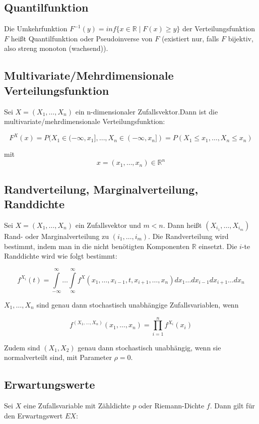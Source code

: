 \documentclass{scrartcl}%
\begin{document}
\subsection{Quantilfunktion}
Die Umkehrfunktion $F^{-1} (y) = inf\{x \in \mathbb{R} \mid F(x) \geq y\}$ der Verteilungsfunktion $F$ heißt Quantilfunktion oder Pseudoinverse von $F$ (existiert nur, falls $F$ bijektiv, also streng monoton (wachsend)).

\subsection{Multivariate/Mehrdimensionale Verteilungsfunktion}
Sei $X = (X_1, \ldots, X_n)$ ein n-dimensionaler Zufallsvektor.Dann ist die multivariate/mehrdimensionale Verteilungsfunktion:

\[F^X (x) = P(X_1 \in (-\infty,x_1], \ldots, X_n \in (-\infty,x_n]) = P(X_1 \leq x_1, \ldots, X_n \leq x_n)\]

mit
\[x = (x_1, \ldots, x_n) \in \mathbb{R}^n\]

\subsection{Randverteilung, Marginalverteilung, Randdichte}
Sei $X = (X_1, \ldots, X_n)$ ein Zufallsvektor und $m<n$. Dann heißt $(X_{i_1}, \ldots, X_{i_m})$ Rand- oder Marginalverteilung zu $(i_1, \ldots, i_m)$. Die Randverteilung wird bestimmt, indem man in die nicht benötigten Komponenten $\mathbb{R}$ einsetzt. Die $i$-te Randdichte wird wie folgt bestimmt:

\[f^{X_i} (t) = \int\limits_{-\infty}^\infty\ldots\int\limits_{\infty}^\infty f^X (x_1,\ldots,x_{i-1},t,x_{i+1},\ldots,x_n) dx_1\ldots dx_{i-1} dx_{i+1}\ldots dx_n\]

$X_1, \ldots, X_n$ sind genau dann stochastisch unabhängige Zufallsvariablen, wenn

\[f^{(X_1,\ldots, X_n)} (x_1,\ldots,x_n) = \prod\limits_{i=1}^n f^{X_i} (x_i)\]

Zudem sind $(X_1,X_2)$ genau dann stochastisch unabhängig, wenn sie normalverteilt sind, mit Parameter $\rho = 0$.

\subsection{Erwartungswerte}
Sei $X$ eine Zufallsvariable mit Zähldichte $p$ oder Riemann-Dichte $f$. Dann gilt für den Erwartngswert $EX$:
\end{document}
